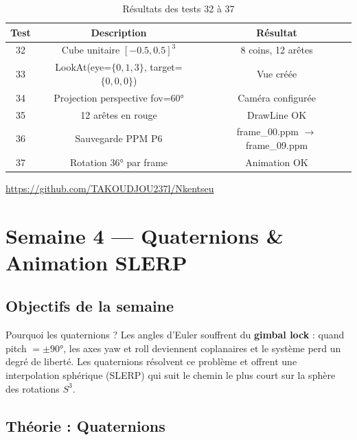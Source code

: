 \documentclass[12pt,a4paper]{report}
\begin{document}
\begin{table}[H]
    \centering
    \begin{tabular}{|c|c|c|}
        \hline
        \textbf{Test} & \textbf{Description} & \textbf{Résultat} \\
        \hline
        32 & Cube unitaire $[-0.5, 0.5]^3$ & 8 coins, 12 arêtes \\
        33 & LookAt(eye=$\{0,1,3\}$, target=$\{0,0,0\}$) & Vue créée \\
        34 & Projection perspective fov=60° & Caméra configurée \\
        35 & 12 arêtes en rouge & DrawLine OK \\
        36 & Sauvegarde PPM P6 & frame\_00.ppm $\to$ frame\_09.ppm \\
        37 & Rotation 36° par frame & Animation OK \\
        \hline
    \end{tabular}
    \caption{Résultats des tests 32 à 37}
\end{table}

\url{https://github.com/TAKOUDJOU237l/Nkentseu}

\newpage

\chapter*{Semaine 4 --- Quaternions \& Animation SLERP}

\section*{Objectifs de la semaine}

\begin{theorybox}{Pourquoi les quaternions ?}
Les angles d'Euler souffrent du \textbf{gimbal lock} : quand
pitch $= \pm 90°$, les axes yaw et roll deviennent coplanaires
et le système perd un degré de liberté. Les quaternions résolvent
ce problème et offrent une interpolation sphérique (SLERP) qui
suit le chemin le plus court sur la sphère des rotations $S^3$.
\end{theorybox}

\section{Théorie : Quaternions}
\end{document}
